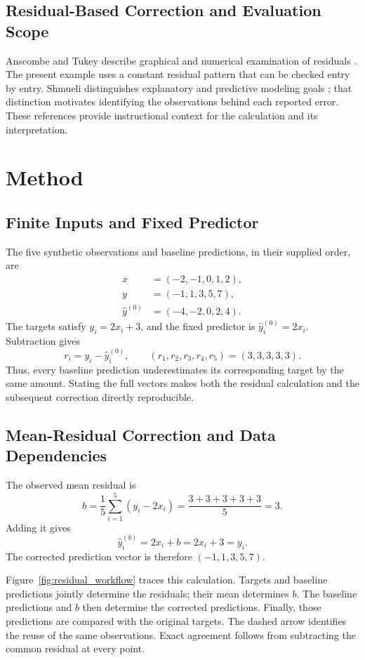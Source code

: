 \documentclass[11pt]{article}
\begin{document}
\subsection{Residual-Based Correction and Evaluation Scope}

Anscombe and Tukey describe graphical and numerical examination of residuals \cite{Anscombe1963ExaminationAnalysis}. The present example uses a constant residual pattern that can be checked entry by entry. Shmueli distinguishes explanatory and predictive modeling goals \cite{Shmueli2010ExplainOr}; that distinction motivates identifying the observations behind each reported error. These references provide instructional context for the calculation and its interpretation.

\section{Method}

\subsection{Finite Inputs and Fixed Predictor}

The five synthetic observations and baseline predictions, in their supplied order, are
\[
\begin{aligned}
x&=(-2,-1,0,1,2),\\
y&=(-1,1,3,5,7),\\
\widehat{y}^{(0)}&=(-4,-2,0,2,4).
\end{aligned}
\]
The targets satisfy $y_i=2x_i+3$, and the fixed predictor is
$\widehat{y}^{(0)}_i=2x_i$. Subtraction gives
\[
r_i=y_i-\widehat{y}^{(0)}_i,\qquad
(r_1,r_2,r_3,r_4,r_5)=(3,3,3,3,3).
\]
Thus, every baseline prediction underestimates its corresponding target by the same amount. Stating the full vectors makes both the residual calculation and the subsequent correction directly reproducible.

\subsection{Mean-Residual Correction and Data Dependencies}

The observed mean residual is
\[
b=\frac{1}{5}\sum_{i=1}^{5}(y_i-2x_i)
=\frac{3+3+3+3+3}{5}=3.
\]
Adding it gives
\[
\widehat{y}^{(b)}_i=2x_i+b=2x_i+3=y_i.
\]
The corrected prediction vector is therefore $(-1,1,3,5,7)$.

Figure~\ref{fig:residual_workflow} traces this calculation. Targets and baseline predictions jointly determine the residuals; their mean determines $b$. The baseline predictions and $b$ then determine the corrected predictions. Finally, those predictions are compared with the original targets. The dashed arrow identifies the reuse of the same observations. Exact agreement follows from subtracting the common residual at every point.
\end{document}
